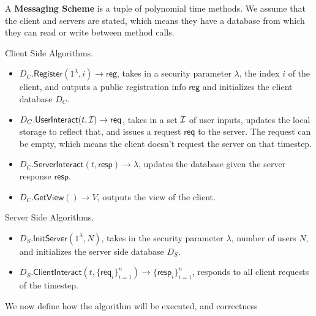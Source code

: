 \documentclass{article}
\newcommand{\reg}{\mathsf{reg}}
\newcommand{\req}{\mathsf{req}}
\newcommand{\resp}{\mathsf{resp}}
\begin{document}
\begin{definition}
A \textbf{Messaging Scheme} is a tuple of polynomial time methods. We assume that the client and servers are stated, which means they have a database from which they can read or write between method calls.

Client Side Algorithms.
\begin{itemize}
    \item $D_C.\mathsf{Register}(1^{\lambda}, i) \to \reg$, takes in a security parameter $\lambda$, the index $i$ of the client, and outputs a public registration info $\reg$ and initializes the client database $D_C$.
    
    \item $D_C.\mathsf{UserInteract}(t, \cI) \to \req$, takes in a set $\mathcal I$ of user inputs, updates the local storage to reflect that, and issues a request $\req$ to the server. The request can be empty, which means the client doesn't request the server on that timestep.
    
    \item $D_C.\mathsf{ServerInteract}(t, \resp)\to \lambda$, updates the database given the server response $\resp$.
    
    \item $D_C.\mathsf{GetView}() \to V$, outputs the view of the client.
\end{itemize}

Server Side Algorithms.

\begin{itemize}
    \item $D_S.\mathsf{InitServer}(1^{\lambda}, N)$, takes in the security parameter $\lambda$, number of users $N$, and initializes the server side database $D_S$.
    \item $D_S.\mathsf{ClientInteract}(t, \{\req_i\}_{i = 1}^n) \to \{\resp_i\}_{i = 1}^n$, responds to all client requests of the timestep.
\end{itemize}
\end{definition}
We now define how the algorithm will be executed, and correctness
\end{document}
